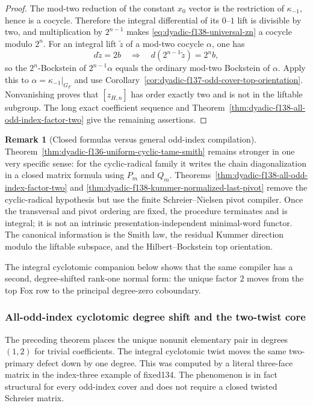 \documentclass[11pt]{article}
\theoremstyle{definition}
\newtheorem{remark}[theorem]{Remark}
\begin{document}
\begin{proof}
The mod-two reduction of the constant $x_0$ vector
is the restriction of $\kappa_{-1}$, hence is a
cocycle.  Therefore the integral differential of
its $0$--$1$ lift is divisible by two, and
multiplication by $2^{n-1}$ makes
\eqref{eq:dyadic-f138-universal-zn} a cocycle
modulo $2^n$.
For an integral lift $\widetilde z$ of a mod-two
cocycle $\alpha$, one has
\[
d\widetilde z=2b
\quad\Longrightarrow\quad
d(2^{n-1}\widetilde z)=2^n b,
\]
so the $2^n$-Bockstein of
$2^{n-1}\alpha$ equals the ordinary
mod-two Bockstein of $\alpha$.
Apply this to
$\alpha=\kappa_{-1}|_{G_F}$ and use
Corollary~\ref{cor:dyadic-f137-odd-cover-top-orientation}.
Nonvanishing proves that $[z_{H,n}]$ has order
exactly two and is not in the liftable subgroup.
The long exact coefficient sequence and
Theorem~\ref{thm:dyadic-f138-all-odd-index-factor-two}
give the remaining assertions.
\end{proof}

\begin{remark}[Closed formulas versus general odd-index compilation]
\label{rem:dyadic-f138-closed-versus-general}
Theorem~\ref{thm:dyadic-f136-uniform-cyclic-tame-smith}
remains stronger in one very specific sense:
for the cyclic-radical family it writes the
chain diagonalization in a closed matrix formula
using $P_m$ and $Q_m$.
Theorems~\ref{thm:dyadic-f138-all-odd-index-factor-two}
and
\ref{thm:dyadic-f138-kummer-normalized-last-pivot}
remove the cyclic-radical hypothesis but use the
finite Schreier--Nielsen pivot compiler.
Once the transversal and pivot ordering are fixed,
the procedure terminates and is integral; it is
not an intrinsic presentation-independent
minimal-word functor.
The canonical information is the Smith law,
the residual Kummer direction modulo the liftable
subspace, and the Hilbert--Bockstein top
orientation.
\end{remark}

The integral cyclotomic companion below shows that
the same compiler has a second, degree-shifted
rank-one normal form: the unique factor $2$ moves
from the top Fox row to the principal degree-zero
coboundary.


\subsubsection{All-odd-index cyclotomic degree shift and the two-twist core}
\label{subsubsec:dyadic-f139-all-odd-index-cyclotomic}

The preceding theorem places the unique nonunit
elementary pair in degrees $(1,2)$ for trivial
coefficients.  The integral cyclotomic twist moves
the same two-primary defect down by one degree.
This was computed by a literal three-face matrix in
the index-three example of fixed134.  The phenomenon
is in fact structural for every odd-index cover and
does not require a closed twisted Schreier matrix.
\end{document}
